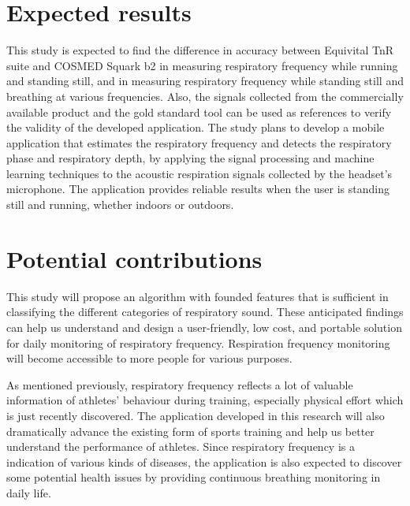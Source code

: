 \section{Expected results}
This study is expected to find the difference in accuracy between Equivital TnR suite and COSMED Squark b2 in measuring respiratory frequency while running and standing still, and in measuring respiratory frequency while standing still and breathing at various frequencies. Also, the signals collected from the commercially available product and the gold standard tool can be used as references to verify the validity of the developed application. The study plans to develop a mobile application that estimates the respiratory frequency and detects the respiratory phase and respiratory depth, by applying the signal processing and machine learning techniques to the acoustic respiration signals collected by the headset’s microphone. The application provides reliable results when the user is standing still and running, whether indoors or outdoors.

\section{Potential contributions}
This study will propose an algorithm with founded features that is sufficient in classifying the different categories of respiratory sound. These anticipated findings can help us understand and design a user-friendly, low cost, and portable solution for daily monitoring of respiratory frequency. Respiration frequency monitoring will become accessible to more people for various purposes. 

As mentioned previously, respiratory frequency reflects a lot of valuable information of athletes’ behaviour during training, especially physical effort which is just recently discovered. The application developed in this research will also dramatically advance the existing form of sports training and help us better understand the performance of athletes. Since respiratory frequency is a indication of various kinds of diseases, the application is also expected to discover some potential health issues by providing continuous breathing monitoring in daily life. 